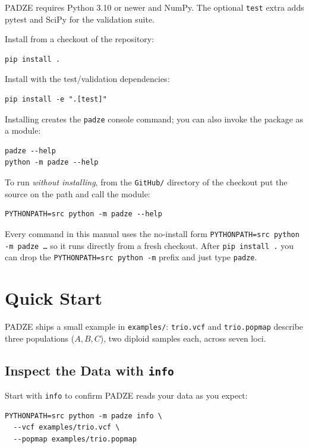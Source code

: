 \documentclass[11pt]{article}
\newcommand{\padze}{PADZE}
\begin{document}
\padze{} requires Python 3.10 or newer and NumPy. The optional \texttt{test}
extra adds pytest and SciPy for the validation suite.

Install from a checkout of the repository:
\begin{lstlisting}[style=cmd]
pip install .
\end{lstlisting}

Install with the test/validation dependencies:
\begin{lstlisting}[style=cmd]
pip install -e ".[test]"
\end{lstlisting}

Installing creates the \texttt{padze} console command; you can also invoke the
package as a module:
\begin{lstlisting}[style=cmd]
padze --help
python -m padze --help
\end{lstlisting}

To run \emph{without installing}, from the \texttt{GitHub/} directory of the
checkout put the source on the path and call the module:
\begin{lstlisting}[style=cmd]
PYTHONPATH=src python -m padze --help
\end{lstlisting}

Every command in this manual uses the no-install form
\texttt{PYTHONPATH=src python -m padze \ldots} so it runs directly from a fresh
checkout. After \texttt{pip install .} you can drop the
\texttt{PYTHONPATH=src python -m} prefix and just type \texttt{padze}.

\section{Quick Start}
\label{sec:quickstart}

\padze{} ships a small example in \texttt{examples/}: \texttt{trio.vcf} and
\texttt{trio.popmap} describe three populations (\(A, B, C\)), two diploid
samples each, across seven loci.

\subsection{Inspect the Data with \texttt{info}}
\label{sec:info}

Start with \texttt{info} to confirm \padze{} reads your data as you expect:
\begin{lstlisting}[style=cmd]
PYTHONPATH=src python -m padze info \
  --vcf examples/trio.vcf \
  --popmap examples/trio.popmap
\end{lstlisting}
\end{document}
